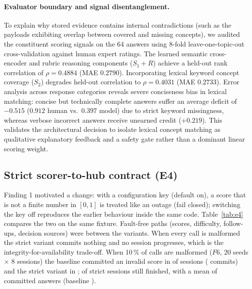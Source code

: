 \documentclass[runningheads]{llncs}
\begin{document}
\paragraph{Evaluator boundary and signal disentanglement.} To explain why stored evidence contains internal contradictions (such as the \overlapN{} payloads exhibiting overlap between covered and missing concepts), we audited the constituent scoring signals on the 64 answers using 8-fold leave-one-topic-out cross-validation against human expert ratings. The learned semantic cross-encoder and rubric reasoning components ($S_1 + R$) achieve a held-out rank correlation of $\rho = 0.4884$ (MAE $0.2790$). Incorporating lexical keyword concept coverage ($S_2$) degrades held-out correlation to $\rho = 0.4031$ (MAE $0.2733$). Error analysis across response categories reveals severe conciseness bias in lexical matching: concise but technically complete answers suffer an average deficit of $-0.515$ ($0.912$ human vs.\ $0.397$ model) due to strict keyword missingness, whereas verbose incorrect answers receive unearned credit ($+0.219$). This validates the architectural decision to isolate lexical concept matching as qualitative explanatory feedback and a safety gate rather than a dominant linear scoring weight.

\subsection{Strict scorer-to-hub contract (E4)}\label{sec:e4}
Finding 1 motivated a change: with a configuration key (default on), a score that is not a finite number in $[0,1]$ is treated like an outage (fail closed); switching the key off reproduces the earlier behaviour inside the same code. Table~\ref{tab:e4} compares the two on the same fixture. Fault-free paths (scores, difficulty, follow-ups, decision sources) were \fOidentical{} between the variants. When every call is malformed the strict variant commits nothing and no session progresses, which is the integrity-for-availability trade-off. When 10\,\% of calls are malformed ($F6$, 20 seeds $\times$ 8 sessions) the baseline committed an invalid score in \fSixBsess{} of \fSixBn{} sessions (\fSixBcount{} commits) and the strict variant in \fSixSsess{}; \fSixSdone{} of \fSixBn{} strict sessions still finished, with a mean of \fSixSans{} committed answers (baseline \fSixBans{}).
\end{document}
